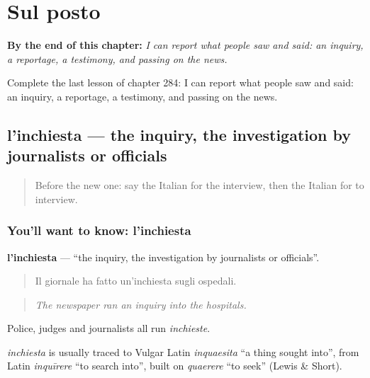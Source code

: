 
\chapter{Sul posto}
\label{ch:it-sul-posto}

\begin{chapteropening}
\textbf{By the end of this chapter:} \emph{I can report what people saw and said: an inquiry, a reportage, a testimony, and passing on the news.}

Complete the last lesson of chapter 284: I can report what people saw and said: an inquiry, a reportage, a testimony, and passing on the news.
\end{chapteropening}

\section[l'inchiesta]{l'inchiesta — the inquiry, the investigation by journalists or officials}

\label{lesson:IT-C284-inchiesta}



\begin{quote}
Before the new one: say the Italian for the interview, then the Italian for to interview.
\end{quote}

\subsection*{You'll want to know: l'inchiesta}
\textbf{l'inchiesta} — \textquotedblleft{}the inquiry, the investigation by journalists or officials\textquotedblright{}.

\begin{quote}
Il giornale ha fatto un'inchiesta sugli ospedali.
\end{quote}

\begin{quote}
\emph{The newspaper ran an inquiry into the hospitals.}
\end{quote}

Police, judges and journalists all run \emph{inchieste}.

\begin{cousinweb}
\emph{inchiesta} is usually traced to Vulgar Latin \emph{inquaesita} \textquotedblleft{}a thing sought into\textquotedblright{}, from Latin \emph{inquīrere} \textquotedblleft{}to search into\textquotedblright{}, built on \emph{quaerere} \textquotedblleft{}to seek\textquotedblright{} (Lewis \& Short).
\end{cousinweb}

